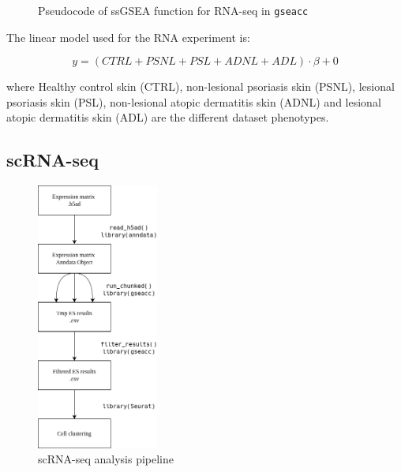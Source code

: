 \documentclass[aps,prb,twocolumn,superscriptaddress,floatfix,longbibliography]{revtex4-2}
\newif\ifptitle
\newif\ifpnumber
\newcounter{para}
\newcommand\ptitle[1]{\par\refstepcounter{para}
{\ifpnumber{\noindent\textcolor{lightgray}{\textbf{\thepara}}\indent}\fi}
{\ifptitle{\textbf{[{#1}]}}\fi}}
\begin{document}
\begin{figure}[h]
\caption{Pseudocode of ssGSEA function for RNA-seq in \texttt{gseacc}}
\label{fig:gsea-algorithm}
\begin{algorithmic}[1]
            \Else
            \EndIf
        \EndFor
    \EndFor
\EndFor
\end{algorithmic}
\end{figure}


\ptitle{Limma} The linear model used for the RNA experiment is:

\begin{equation}
y = (CTRL + PSNL + PSL + ADNL + ADL) \cdot \beta + 0
\end{equation}

where Healthy control skin (CTRL), non-lesional psoriasis skin (PSNL), lesional psoriasis skin (PSL), non-lesional atopic dermatitis skin (ADNL) and lesional atopic dermatitis skin (ADL) are the different dataset phenotypes.

\subsection{scRNA-seq}

\begin{figure}[H]
\centering
\includegraphics[clip=true,width=4cm]{img/pipeline.png}
\caption{scRNA-seq analysis pipeline}
\label{fig:pixels}
\end{figure}
\end{document}
